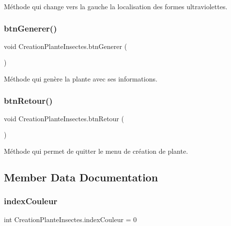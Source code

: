 Méthode qui change vers la gauche la localisation des formes ultraviolettes. \mbox{\label{class_creation_plante_insectes_a3ca269fecd6372a420d67129833b5c45}} 
\subsubsection{\texorpdfstring{btn\+Generer()}{btnGenerer()}}
{\footnotesize\ttfamily void Creation\+Plante\+Insectes.\+btn\+Generer (\begin{DoxyParamCaption}{ }\end{DoxyParamCaption})\hspace{0.3cm}{\ttfamily [inline]}}

Méthode qui genère la plante avec ses informations. \mbox{\label{class_creation_plante_insectes_a3aaf0d3b14022a5806ba67c0b2bf9faf}} 
\subsubsection{\texorpdfstring{btn\+Retour()}{btnRetour()}}
{\footnotesize\ttfamily void Creation\+Plante\+Insectes.\+btn\+Retour (\begin{DoxyParamCaption}{ }\end{DoxyParamCaption})\hspace{0.3cm}{\ttfamily [inline]}}

Méthode qui permet de quitter le menu de création de plante. 

\subsection{Member Data Documentation}
\mbox{\label{class_creation_plante_insectes_a42db215c44c671e62a4a749527b35ad4}} 
\subsubsection{\texorpdfstring{index\+Couleur}{indexCouleur}}
{\footnotesize\ttfamily int Creation\+Plante\+Insectes.\+index\+Couleur = 0\hspace{0.3cm}{\ttfamily [private]}}

